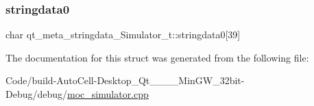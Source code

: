\subsubsection{\texorpdfstring{stringdata0}{stringdata0}}
{\footnotesize\ttfamily char qt\+\_\+meta\+\_\+stringdata\+\_\+\+Simulator\+\_\+t\+::stringdata0\mbox{[}39\mbox{]}}



The documentation for this struct was generated from the following file\+:\begin{DoxyCompactItemize}
\item 
Code/build-\/\+Auto\+Cell-\/\+Desktop\+\_\+\+Qt\+\_\+\_\+\_\+\_\+\+Min\+G\+W\+\_\+32bit-\/\+Debug/debug/\mbox{\hyperlink{moc__simulator_8cpp}{moc\+\_\+simulator.\+cpp}}\end{DoxyCompactItemize}
